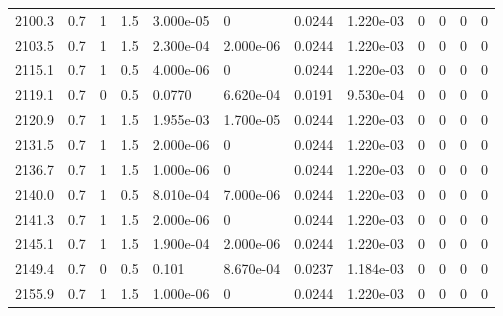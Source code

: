 \documentclass[preview]{standalone}
\begin{document}
{{{{{{{{{{{{\begin{tabular}{L{1.2cm}C{1.2cm} C{0.3cm}C{0.5cm} C{1.4cm}C{1.4cm} C{1.4cm}C{1.4cm} C{1.6cm}C{1.6cm} C{1.6cm}C{1.6cm}}
  2100.3  &   0.7  & 1     & 1.5 &  3.000e-05  & 0  &  0.0244&   1.220e-03& 0 & 0   &  0 & 0  \\ 
  2103.5  &   0.7  & 1     & 1.5 &  2.300e-04  & 2.000e-06  &  0.0244&   1.220e-03& 0 & 0   &  0 & 0  \\ 
  2115.1  &   0.7  & 1     & 0.5 &  4.000e-06  & 0  &  0.0244&   1.220e-03& 0 & 0   &  0 & 0  \\ 
  2119.1  &   0.7  & 0     & 0.5 &  0.0770  & 6.620e-04  &  0.0191&   9.530e-04& 0 & 0   &  0 & 0  \\ 
  2120.9  &   0.7  & 1     & 1.5 &  1.955e-03  & 1.700e-05  &  0.0244&   1.220e-03& 0 & 0   &  0 & 0  \\ 
  2131.5  &   0.7  & 1     & 1.5 &  2.000e-06  & 0  &  0.0244&   1.220e-03& 0 & 0   &  0 & 0  \\ 
  2136.7  &   0.7  & 1     & 1.5 &  1.000e-06  & 0  &  0.0244&   1.220e-03& 0 & 0   &  0 & 0  \\ 
  2140.0  &   0.7  & 1     & 0.5 &  8.010e-04  & 7.000e-06  &  0.0244&   1.220e-03& 0 & 0   &  0 & 0  \\ 
  2141.3  &   0.7  & 1     & 1.5 &  2.000e-06  & 0  &  0.0244&   1.220e-03& 0 & 0   &  0 & 0  \\ 
  2145.1  &   0.7  & 1     & 1.5 &  1.900e-04  & 2.000e-06  &  0.0244&   1.220e-03& 0 & 0   &  0 & 0  \\ 
  2149.4  &   0.7  & 0     & 0.5 &  0.101  & 8.670e-04  &  0.0237&   1.184e-03& 0 & 0   &  0 & 0  \\ 
  2155.9  &   0.7  & 1     & 1.5 &  1.000e-06  & 0  &  0.0244&   1.220e-03& 0 & 0   &  0 & 0  \\ 
\hline 
\end{tabular} 

}}}}}}}}}}}}
\end{document}
